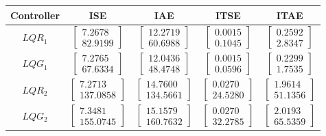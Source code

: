 \documentclass[a4paper,11pt]{book}
\numberwithin{figure}{chapter}
\numberwithin{equation}{chapter}
\numberwithin{table}{chapter}
\theoremstyle{definition}
\begin{document}
\begin{table}[ht]
	\centering
	\begin{tabular}{c | c c c c}
		\textbf{Controller} & \textbf{ISE} & \textbf{IAE} & \textbf{ITSE} & \textbf{ITAE} \\
		\hline
		$LQR_1$  & $\begin{bmatrix} 7.2678 \\ 82.9199 \end{bmatrix}$ & $\begin{bmatrix} 12.2719   \\ 60.6988 \end{bmatrix}$ & $\begin{bmatrix} 0.0015 \\ 0.1045 \end{bmatrix}$ & $\begin{bmatrix} 0.2592 \\ 2.8347 \end{bmatrix}$ \\
		$LQG_1$ & $\begin{bmatrix} 7.2765 \\ 67.6334 \end{bmatrix}$ & $\begin{bmatrix} 12.0436   \\ 48.4748 \end{bmatrix}$	& $\begin{bmatrix} 0.0015 \\ 0.0596 \end{bmatrix}$ & $\begin{bmatrix} 0.2299 \\ 1.7535 \end{bmatrix}$ \\
		$LQR_2$ & $\begin{bmatrix} 7.2713 \\ 137.0858 \end{bmatrix}$ & $\begin{bmatrix} 14.7600 \\  134.5661 \end{bmatrix}$	& $\begin{bmatrix} 0.0270 \\ 24.5280 \end{bmatrix}$ & $\begin{bmatrix} 1.9614 \\ 51.1356 \end{bmatrix}$ \\	
		$LQG_2$ & $\begin{bmatrix} 7.3481 \\ 155.0745 \end{bmatrix}$ & $\begin{bmatrix} 15.1579  \\ 160.7632 \end{bmatrix}$ & $\begin{bmatrix} 0.0270 \\ 32.2785 \end{bmatrix}$ & $\begin{bmatrix} 2.0193 \\ 65.5359 \end{bmatrix}$ \\
	\end{tabular}
	

\end{table}
\end{document}
